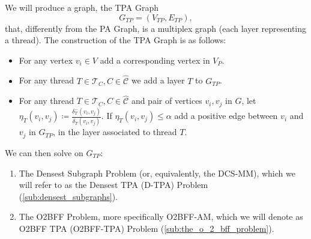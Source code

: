 We will produce a graph, the \acrfull{TPA} Graph
\begin{equation*}
	G_{TP} = (V_{TP}, E_{TP}),
\end{equation*}
that, differently from the \acrshort{PA} Graph, is a multiplex
graph (each layer representing a thread). The construction of the
\acrshort{TPA} Graph is as follows:

\begin{itemize}
	\item For any vertex $v_{i} \in V$ add a corresponding vertex in $V_{P} $.
	\item For any thread $T \in
		      \mathcal{T}_{C}, C \in \mathcal{\hat{C}}$ we add a layer $T$ to
	      $G_{TP}$.
	\item For any thread $T \in
		      \mathcal{T}_{C}, C \in \mathcal{\hat{C}}$ and pair of vertices
	      $v_i, v_j$ in $G$, let $\eta_{T}(v_i,v_j)
		      \coloneqq \frac{\delta^{-} _{T}(v_i,v_j)}{\delta _{T}(v_i,v_j)} $. If
	      $\eta_{T}(v_i,v_j) \leq \alpha $ add a positive edge between $v_{i} $ and
	      $v_{j} $ in $G_{TP} $, in the layer associated to thread $T$.
\end{itemize}

We can then solve on $G_{TP}$:

\begin{enumerate}
	\item The Densest Subgraph Problem (or, equivalently, the
	      \acrshort{DCS}-MM), which we will refer to as the Densest
	      \acrlong{TPA} (D-\acrshort{TPA}) Problem
	      (\autoref{sub:densest_subgraphs}).
	\item The \acrshort{O2BFF} Problem, more specifically \acrshort{O2BFF}-AM,
	      which we will denote as \acrshort{O2BFF} \acrlong{TPA}
	      (\acrshort{O2BFF}-\acrshort{TPA}) Problem
	      (\autoref{sub:the_o_2_bff_problem}).
\end{enumerate}

